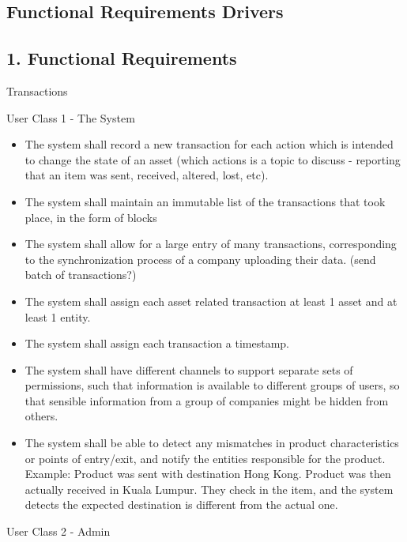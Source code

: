 \subsection{Functional Requirements Drivers}
	
\subsection*{1. Functional  Requirements}

	
     Transactions
        \par User Class 1 - The System 
        \begin{itemize}
			\item The system shall record a new transaction for each action which is intended to change the state of an asset (which actions is a topic to discuss - reporting that an item was sent, received, altered, lost, etc).
			\item The system shall maintain an immutable list of the transactions that took place, in the form of blocks
			\item The system shall allow for a large entry of many transactions, corresponding to the synchronization process of a company uploading their data. (send batch of transactions?)
			\item The system shall assign each asset related transaction at least 1 asset and  at least 1 entity.
			\item The system shall assign each transaction a timestamp.
			\item The system shall have different channels to support separate sets of permissions, such that information is available to different groups of users, so that sensible information from a group of companies might be hidden from others.
			\item The system shall be able to detect any mismatches in product characteristics or points of entry/exit, and notify the entities responsible for the product.
			Example: Product was sent with destination Hong Kong. Product was then actually received in Kuala Lumpur. They check in the item, and the system detects the expected destination is different from the actual one.
        \end{itemize}
        \par User Class 2 - Admin
